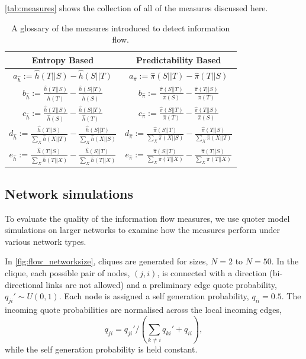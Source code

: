 \autoref{tab:measures} shows the collection of all of the measures discussed here. 

\begin{table}[!htbp]
\centering
\begin{tabular}{cc}
 Entropy Based & Predictability Based  \\ 
\toprule
 $ \displaystyle a_{\hat{h}} := \hat{h}(T||S) - \hat{h}(S||T)$ & 
$ \displaystyle a_{\hat{\pi}} := \hat{\pi}(S||T) - \hat{\pi}(T||S)$ \\
\midrule
 $ \displaystyle b_{\hat{h}} := \frac{\hat{h}(T||S)}{\hat{h}(T)} - \frac{\hat{h}(S||T)}{\hat{h}(S)}$ & 
$ \displaystyle b_{\hat{\pi}} := \frac{\hat{\pi}(S||T)}{\hat{\pi}(S)} - \frac{\hat{\pi}(T||S)}{\hat{\pi}(T)}$ \\
 $ \displaystyle c_{\hat{h}} := \frac{\hat{h}(T||S)}{\hat{h}(S)} - \frac{\hat{h}(S||T)}{\hat{h}(T)}$ & 
$ \displaystyle c_{\hat{\pi}} := \frac{\hat{\pi}(S||T)}{\hat{\pi}(T)} - \frac{\hat{\pi}(T||S)}{\hat{\pi}(S)}$ \\
\midrule 
 $ \displaystyle d_{\hat{h}} := \frac{\hat{h}(T||S)}{\sum_X \hat{h}(X||T)} - \frac{\hat{h}(S||T)}{\sum_X \hat{h}(X||S)}$ &
$ \displaystyle d_{\hat{\pi}} := \frac{\hat{\pi}(S||T)}{\sum_X \hat{\pi}(X||S)} - \frac{\hat{\pi}(T||S)}{\sum_X \hat{\pi}(X||T)}$  \\
\addlinespace[0.5ex]
 $ \displaystyle e_{\hat{h}} := \frac{\hat{h}(T||S)}{\sum_X \hat{h}(T||X)} - \frac{\hat{h}(S||T)}{\sum_X \hat{h}(T||X)}$ & 
$ \displaystyle e_{\hat{\pi}} := \frac{\hat{\pi}(S||T)}{\sum_X \hat{\pi}(T||X)} - \frac{\hat{\pi}(T||S)}{\sum_X \hat{\pi}(T||X)}$ \\
\end{tabular}
\caption{A glossary of the measures introduced to detect information flow.}\label{tab:measures}
\end{table}


\subsection{Network simulations}\label{sec:network_sizes}
To evaluate the quality of the information flow measures, we use quoter model simulations on larger networks to examine how the measures perform under various network types. 

In \autoref{fig:flow_networksize}, cliques are generated for sizes, $N=2$ to $N=50$. In the clique, each possible pair of nodes, $(j,i)$, is connected with a direction (bi-directional links are not allowed) and a preliminary edge quote probability, $q_{ji}' \sim U(0,1)$. Each node is assigned a self generation probability, $q_{ii}=0.5$. The incoming quote probabilities are normalised across the local incoming edges, 
$$q_{ji} = q_{ji}' / \left( \sum_{k\neq i} q_{ki}' + q_{ii} \right),$$
while the self generation probability is held constant. 

